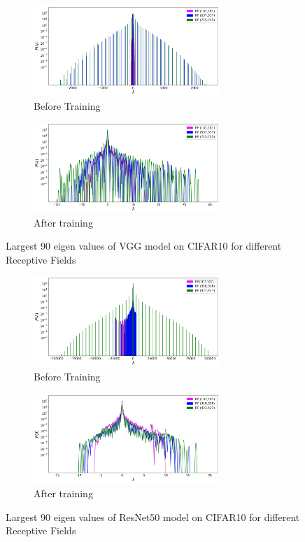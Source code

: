 \begin{figure}[!htp]
 \centering
     \begin{subfigure}[b]{0.45\textwidth}
    \includegraphics[width=7cm]{images/Hessian_spectre_vgg19_init_cifar10.png}
    \caption{Before Training}
    \label{subfig:Hessian_VGG_before_training}
     \end{subfigure}
      \hfill
     \begin{subfigure}[b]{0.45\textwidth}
    \includegraphics[width=7cm]{images/Hessian_spectre_vgg19_trained_cifar10.png}
    \caption{After training}
    \label{subfig:Hessian_VGG_after_training}
     \end{subfigure}
      \caption{Largest 90 eigen values of VGG model on CIFAR10 for different Receptive Fields}%
    \label{fig:hessian_vgg_cifar10}
\end{figure}
\begin{figure}[!htp]
 \centering
     \begin{subfigure}[b]{0.45\textwidth}
    \includegraphics[width=7cm]{images/Hessian_spectre_resnet50_init_cifar10.png}
    \caption{Before Training}
    \label{subfig:}
     \end{subfigure}
      \hfill
     \begin{subfigure}[b]{0.45\textwidth}
    \includegraphics[width=7cm]{images/Hessian_spectre_resnet50_trained_cifar10.png}
    \caption{After training}
    \label{subfig:}
     \end{subfigure}
     \caption{Largest 90 eigen values of ResNet50 model on CIFAR10 for different Receptive Fields }
    \label{fig:hessian_resnet50_cifar10}
\end{figure}
